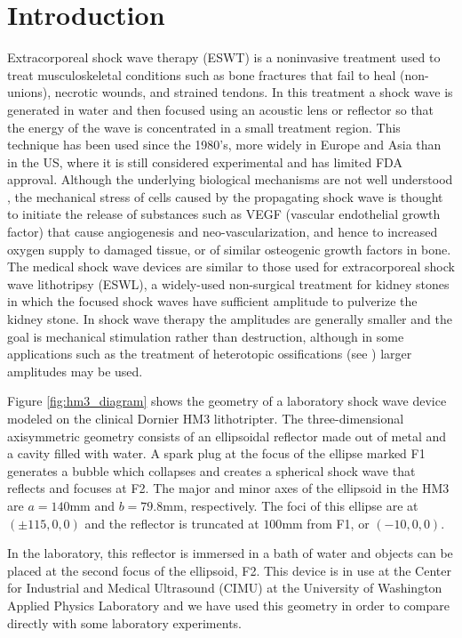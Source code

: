 

\section{Introduction}
Extracorporeal shock wave therapy (ESWT) is a noninvasive treatment
used to treat musculoskeletal conditions such as bone fractures
that fail to heal (non-unions), necrotic wounds, and strained
tendons.  In this treatment a shock wave is generated in water and
then focused using an acoustic lens or reflector so that the energy
of the wave is concentrated in a small treatment region.  This
technique has been used since the 1980's, more widely in Europe and
Asia than in the US, where it is still considered experimental and
has limited FDA approval.  Although the underlying biological
mechanisms are not well understood \cite{ogden}, the mechanical
stress of cells caused by the propagating shock wave is thought to
initiate the release of substances such as VEGF (vascular endothelial
growth factor) that cause angiogenesis and neo-vascularization, and
hence to increased oxygen supply to damaged tissue, or of similar
osteogenic growth factors in bone.  The medical shock wave devices
are similar to those used for extracorporeal shock
wave lithotripsy (ESWL), a widely-used non-surgical treatment for
kidney stones in which the focused shock waves have sufficient
amplitude to pulverize the kidney stone.  In shock wave therapy the
amplitudes are generally smaller and the goal is mechanical stimulation
rather than destruction, although in some applications such as the
treatment of heterotopic ossifications (see ) larger
amplitudes may be used.

Figure \ref{fig:hm3_diagram} shows the geometry of a laboratory
shock wave device 
modeled on the clinical Dornier HM3 lithotripter.  The three-dimensional
axisymmetric geometry consists of an ellipsoidal reflector made out
of metal and a cavity filled with water.  A spark plug at the focus
of the ellipse marked F1 generates a bubble which collapses and
creates a spherical shock wave that reflects and focuses at F2.  
The major and minor axes of the
ellipsoid in the HM3 are $a=140$mm and $b=79.8$mm, respectively.
The foci of this ellipse are at $(\pm 115, 0, 0)$ and the reflector
is truncated at $100$mm from F1, or $(-10,0,0)$.  

In the laboratory, this reflector is immersed in a bath of water
and objects can be
placed at the second focus of the ellipsoid, F2.
This device is in use at the Center for Industrial and Medical Ultrasound
(CIMU) at the University of Washington Applied Physics Laboratory and we
have used this geometry in order to compare directly with some laboratory
experiments.

